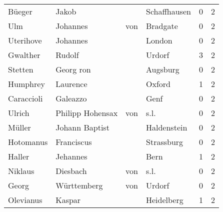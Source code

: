 \begin{tabular}{llllrr}
                   Büeger &                              Jakob &             &                                Schaffhausen &          0 &         2 \\
                      Ulm &                           Johannes &         von &                                    Bradgate &          0 &         2 \\
                Uterihove &                           Johannes &             &                                      London &          0 &         2 \\
                 Gwalther &                             Rudolf &             &                                      Urdorf &          3 &         2 \\
                  Stetten &                          Georg ron &             &                                    Augsburg &          0 &         2 \\
                 Humphrey &                           Laurence &             &                                      Oxford &          1 &         2 \\
               Caraccioli &                           Galeazzo &             &                                        Genf &          0 &         2 \\
                   Ulrich &                  Philipp  Hohensax &         von &                                        s.l. &          0 &         2 \\
                   Müller &                     Johann Baptist &             &                                 Haldenstein &          0 &         2 \\
                Hotomanus &                         Franciscus &             &                                  Strassburg &          0 &         2 \\
                   Haller &                           Jehannes &             &                                        Bern &          1 &         2 \\
                  Niklaus &                           Diesbach &         von &                                        s.l. &          0 &         2 \\
                    Georg &                        Württemberg &         von &                                      Urdorf &          0 &         2 \\
                Olevianus &                             Kaspar &             &                                  Heidelberg &          1 &         2 \\

\end{tabular}
